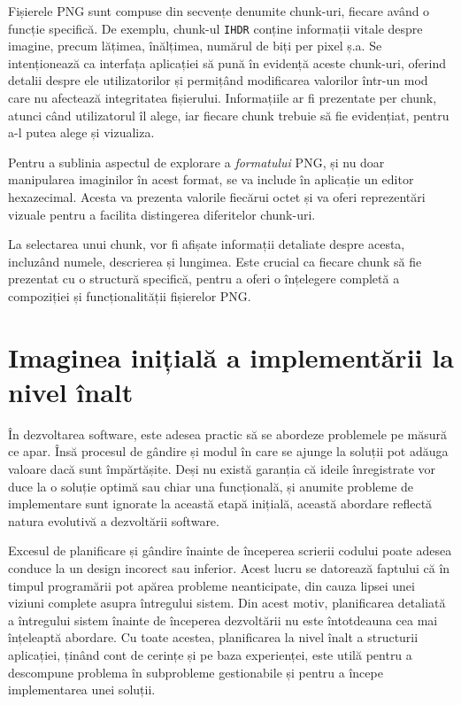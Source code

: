 \documentclass[a4paper,12pt]{report}
\begin{document}
Fișierele \ac{PNG} sunt compuse din secvențe denumite chunk-uri,
fiecare având o funcție specifică.
De exemplu, chunk-ul \texttt{IHDR} conține informații vitale despre imagine,
precum lățimea, înălțimea, numărul de biți per pixel ș.a.
Se intenționează ca interfața aplicației să pună
în evidență aceste chunk-uri, oferind detalii despre ele utilizatorilor
și permițând modificarea valorilor într-un mod
care nu afectează integritatea fișierului.
Informațiile ar fi prezentate per chunk, atunci când utilizatorul îl alege,
iar fiecare chunk trebuie să fie evidențiat, pentru a-l putea alege și vizualiza.

Pentru a sublinia aspectul de explorare a \textit{formatului} \ac{PNG},
și nu doar manipularea imaginilor în acest format,
se va include în aplicație un editor hexazecimal.
Acesta va prezenta valorile fiecărui octet și
va oferi reprezentări vizuale pentru a facilita distingerea diferitelor chunk-uri.

La selectarea unui chunk, vor fi afișate informații detaliate despre acesta,
incluzând numele, descrierea și lungimea.
Este crucial ca fiecare chunk să fie prezentat cu o structură specifică,
pentru a oferi o înțelegere completă a compoziției și funcționalității fișierelor \ac{PNG}.


\section{Imaginea inițială a implementării la nivel înalt}

În dezvoltarea software, este adesea practic să se abordeze problemele pe măsură ce apar.
Însă procesul de gândire și modul în care se ajunge la soluții
pot adăuga valoare dacă sunt împărtășite.
Deși nu există garanția că ideile înregistrate vor duce
la o soluție optimă sau chiar una funcțională,
și anumite probleme de implementare sunt ignorate la această etapă inițială,
această abordare reflectă natura evolutivă a dezvoltării software.

Excesul de planificare și gândire înainte de începerea scrierii codului
poate adesea conduce la un design incorect sau inferior.
Acest lucru se datorează faptului că în timpul programării pot apărea probleme neanticipate,
din cauza lipsei unei viziuni complete asupra întregului sistem.
Din acest motiv, planificarea detaliată a întregului sistem înainte de începerea dezvoltării
nu este întotdeauna cea mai înțeleaptă abordare.
Cu toate acestea, planificarea la nivel înalt a structurii aplicației,
ținând cont de cerințe și pe baza experienței,
este utilă pentru a descompune problema în subprobleme gestionabile
și pentru a începe implementarea unei soluții.
\end{document}
